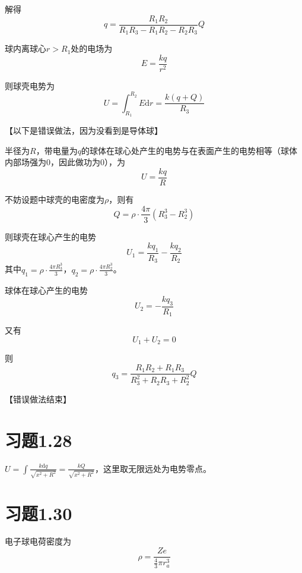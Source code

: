 \documentclass{SCIS2020cn}
\begin{document}
解得
\begin{equation}
    q=\frac{R_1R_2}{R_1R_3-R_1R_2-R_2R_3}Q
\end{equation}

球内离球心$r>R_1$处的电场为
\begin{equation}
    E=\frac{kq}{r^2}
\end{equation}

则球壳电势为
\begin{equation}
    U=\int_{R_1}^{R_2}E\text{d}r=\frac{k(q+Q)}{R_3}
\end{equation}

【以下是错误做法，因为没看到是导体球】

半径为$R$，带电量为$q$的球体在球心处产生的电势与在表面产生的电势相等（球体内部场强为0，因此做功为0），为
\begin{equation}
    U=\frac{kq}{R}
\end{equation}


不妨设题中球壳的电密度为$\rho$，则有
\begin{equation}
    Q=\rho·\frac{4\pi}{3}(R_3^3-R_2^3)
\end{equation}

则球壳在球心产生的电势
\begin{equation}
    U_1=\frac{kq_1}{R_3}-\frac{kq_2}{R_2}
\end{equation}
其中$\displaystyle{}q_1=\rho·\frac{4\pi{}R_3^3}{3}$，$\displaystyle{}q_2=\rho·\frac{4\pi{}R_2^3}{3}$。

球体在球心产生的电势
\begin{equation}
    U_2=-\frac{kq_3}{R_1}
\end{equation}

又有
\begin{equation}
    U_1+U_2=0
\end{equation}

则
\begin{equation}
    q_3=\frac{R_1R_2+R_1R_3}{R_3^2+R_2R_3+R_2^2}Q
\end{equation}

【错误做法结束】
\section{习题1.28}
$\displaystyle{}U=\int\frac{k\text{d}q}{\sqrt{x^2+R^2}}=\frac{kQ}{\sqrt{x^2+R^2}}$，这里取无限远处为电势零点。

\section{习题1.30}
电子球电荷密度为
\begin{equation}
    \rho=\frac{Ze}{\frac{4}{3}\pi{}r_a^3}
\end{equation}
\end{document}
